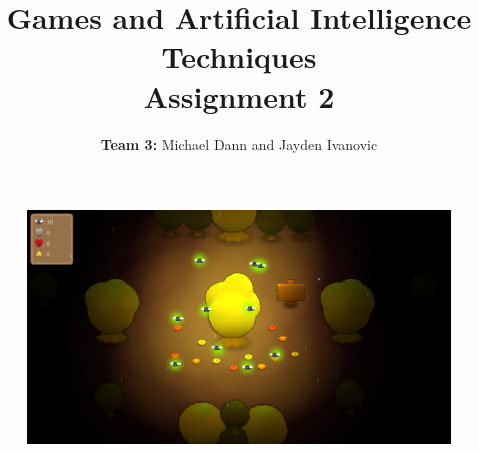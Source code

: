 \documentclass[11pt,a4paper,twoside]{article}
\title{Games and Artificial Intelligence Techniques \\ Assignment 2}
\author{\textbf{Team 3:} Michael Dann and Jayden Ivanovic}
\begin{document}
\maketitle
\begin{figure}[h]
\centering
\includegraphics[width=0.6\linewidth]{./splash}
\end{figure}



\end{document}
